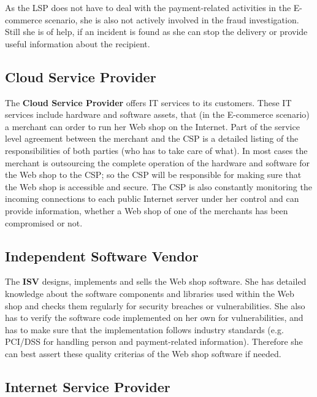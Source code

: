 As the \gls{LSP} does not have to deal with the payment-related activities in the E-commerce scenario, she is also not actively involved in the fraud investigation. Still she is of help, if an incident is found as she can stop the delivery or provide useful information about the recipient.


\subsection{Cloud Service Provider}
\label{subsec:stakeholder_csp}

The \textbf{Cloud Service Provider} offers IT services to its customers. These IT services include hardware and software assets, that (in the E-commerce scenario) a merchant can order to run her Web shop on the Internet. Part of the service level agreement between the merchant and the \gls{CSP} is a detailed listing of the responsibilities of both parties (who has to take care of what). In most cases the merchant is outsourcing the complete operation of the hardware and software for the Web shop to the \gls{CSP}; so the \gls{CSP} will be responsible for making sure that the Web shop is accessible and secure. The \gls{CSP} is also constantly monitoring the incoming connections to each public Internet server under her control and can provide information, whether a Web shop of one of the merchants has been compromised or not.


\subsection{Independent Software Vendor}
\label{subsec:stakeholder_isv}

The \textbf{ISV} designs, implements and sells the Web shop software. She has detailed knowledge about the software components and libraries used within the Web shop and checks them regularly for security breaches or vulnerabilities. She also has to verify the software code implemented on her own for vulnerabilities, and has to make sure that the implementation follows industry standards (e.g. PCI/DSS for handling person and payment-related information). Therefore she can best assert these quality criterias of the Web shop software if needed.


\subsection{Internet Service Provider}
\label{subsec:stakeholder_isp}

